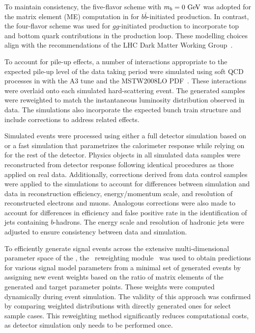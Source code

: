To maintain consistency, the five-flavor scheme with $m_b = 0~\text{GeV}$ was adopted for the matrix element (ME) computation in \MGNLO for $b\bar{b}$-initiated production. In contrast, the four-flavor scheme was used for $gg$-initiated production to incorporate top and bottom quark contributions in the production loop. These modelling choices align with the recommendations of the LHC Dark Matter Working Group~\cite{2HDMWGproxi}.

To account for pile-up effects, a number of interactions appropriate to the expected pile-up level of the data taking period were simulated using soft QCD processes in  with the A3 tune\cite{ATL-PHYS-PUB-2012-003} and the MSTW2008LO PDF~\cite{Martin:2009iq}. These interactions were overlaid onto each simulated hard-scattering event. The generated samples were reweighted to match the instantaneous luminosity distribution observed in data. The simulations also incorporate the expected bunch train structure and include corrections to address related effects.

Simulated events were processed using either a full detector simulation based on \GEANT~\cite{Agostinelli:2002hh, SOFT-2010-01} or a fast simulation\cite{ATL-PHYS-PUB-2010-013} that parametrizes the calorimeter response while relying on \GEANT for the rest of the detector. Physics objects in all simulated data samples were reconstructed from detector response following identical procedures as those applied on real data. Additionally, corrections derived from data control samples were applied to the simulations to account for differences between simulation and data in reconstruction efficiency, energy/momentum scale, and resolution of reconstructed electrons and muons. Analogous corrections were also made to account for differences in efficiency and false positive rate in the identification of jets containing $b$-hadrons. The energy scale and resolution of hadronic jets were adjusted to ensure consistency between data and simulation.

To efficiently generate signal events across the extensive multi-dimensional parameter space of the \hdma, the \mg~reweighting module~\cite{Mattelaer:2016gcx} was used to obtain predictions for various signal model parameters from a minimal set of generated events by assigning new event weights based on the ratio of matrix elements of the generated and target parameter points. These weights were computed dynamically during event simulation. The validity of this approach was confirmed by comparing weighted distributions with directly generated ones for select sample cases. This reweighting method significantly reduces computational costs, as detector simulation only needs to be performed once.

